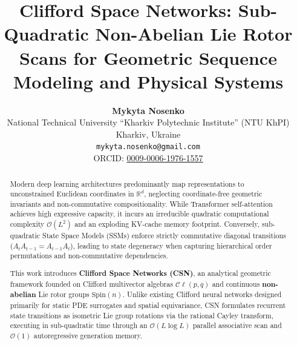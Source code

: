 \documentclass[11pt,a4paper]{article}
\title{\textbf{Clifford Space Networks: Sub-Quadratic Non-Abelian Lie Rotor Scans for Geometric Sequence Modeling and Physical Systems}}
\author{
    \textbf{Mykyta Nosenko} \\
    National Technical University ``Kharkiv Polytechnic Institute'' (NTU KhPI) \\
    Kharkiv, Ukraine \\
    \texttt{mykyta.nosenko@gmail.com} \\
    ORCID: \href{https://orcid.org/0009-0006-1976-1557}{0009-0006-1976-1557}
}
\date{}
\newcommand{\Cl}{\mathcal{C}\ell}
\begin{document}
\maketitle

\begin{abstract}
Modern deep learning architectures predominantly map representations to unconstrained Euclidean coordinates in $\mathbb{R}^d$, neglecting coordinate-free geometric invariants and non-commutative compositionality. While Transformer self-attention achieves high expressive capacity, it incurs an irreducible quadratic computational complexity $\mathcal{O}(L^2)$ and an exploding KV-cache memory footprint. Conversely, sub-quadratic State Space Models (SSMs) enforce strictly commutative diagonal transitions ($A_t A_{t-1} = A_{t-1} A_t$), leading to state degeneracy when capturing hierarchical order permutations and non-commutative dependencies.

This work introduces \textbf{Clifford Space Networks (CSN)}, an analytical geometric framework founded on Clifford multivector algebras $\Cl(p, q)$ and continuous \textbf{non-abelian} Lie rotor groups $\mathrm{Spin}(n)$. Unlike existing Clifford neural networks designed primarily for static PDE surrogates and spatial equivariance, CSN formulates recurrent state transitions as isometric Lie group rotations via the rational Cayley transform, executing in sub-quadratic time through an $\mathcal{O}(L \log L)$ parallel associative scan and $\mathcal{O}(1)$ autoregressive generation memory.


\end{abstract}
\end{document}

